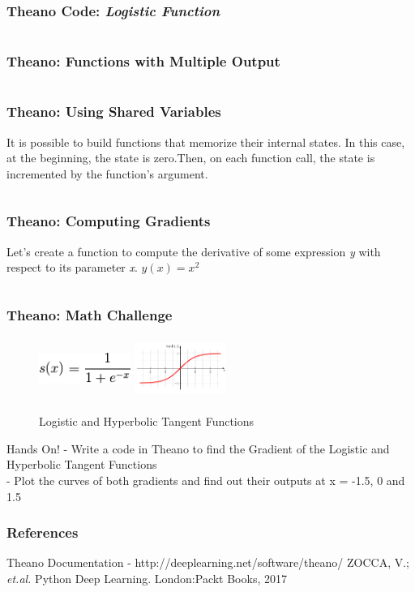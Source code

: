 \documentclass[aspectratio=169]{beamer}
\begin{document}
\begin{frame}
\frametitle{Theano Code: \emph{Logistic Function} }
\inputminted{python}{./aux_files/t7.py}
\end{frame}

\begin{frame}
\frametitle{Theano: Functions with Multiple Output}
\inputminted{python}{./aux_files/t8.py}
\end{frame}

\begin{frame}
\frametitle{Theano: Using Shared Variables}
It is possible to build functions that memorize their internal states. In this case, at the beginning, the state is  zero.Then, on each function call, the state is incremented by the function’s argument.
\inputminted{python}{./aux_files/t9.py}
\end{frame}

\begin{frame}
\frametitle{Theano: Computing Gradients }
Let's create a function to compute the derivative of some expression  \textit{y} with respect to its parameter \textit{x}.
$y(x) = x^{2}$
\inputminted{python}{./aux_files/t10.py}
\end{frame}

\begin{frame}
\frametitle{Theano: Math Challenge}
\begin{figure}
\includegraphics[width=3cm,height=2cm]{./aux_files/t1.jpg}
\includegraphics[width=3cm,height=2cm]{./aux_files/t4.jpg}
\caption{Logistic and Hyperbolic Tangent Functions}
\label{fig:Logistic and tanh Functions}
\end{figure}
Hands On! - Write a code in Theano to find the Gradient of the Logistic and Hyperbolic Tangent Functions
\\[0.3cm] - Plot the curves of both gradients and find out their outputs at x = -1.5, 0 and 1.5
\end{frame}

\begin{frame}
\frametitle{References}
\footnotesize{
\begin{thebibliography}{99}
 Theano  Documentation - http://deeplearning.net/software/theano/
 ZOCCA, V.; \textit{et.al.} Python Deep Learning. London:Packt Books, 2017


\end{thebibliography}
}
\end{frame}
\end{document}
